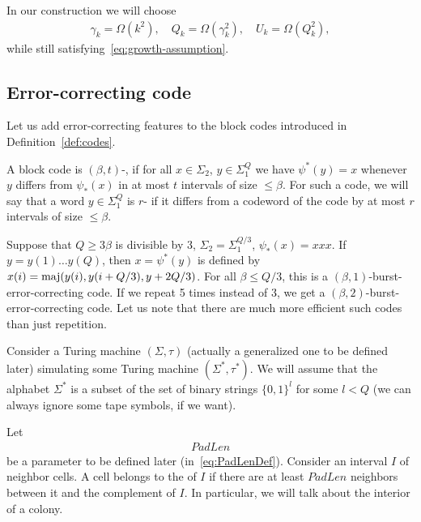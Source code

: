 \documentclass[11pt]{memoir}
\theoremstyle{definition} %
\renewcommand{\le}{\leq}
\renewcommand{\ge}{\geq}
\def\U{U}
\newcommand{\Q}{Q}
\newcommand{\PadLen}{\mathit{PadLen}}
\begin{document}
In our construction we will choose
\begin{align*}
  \gamma_{k}=\Omega(k^{2}),
  \quad \Q_{k} = \Omega(\gamma_{k}^{2}),
  \quad \U_{k} = \Omega(\Q_{k}^{2}),
\end{align*}
while still satisfying~\eqref{eq:growth-assumption}.

\subsection{Error-correcting code}\label{sec:coding}

Let us add error-correcting features to the block codes introduced in
Definition~\ref{def:codes}.

\begin{sloppypar}
\begin{definition}\label{def:err-code}
A block code is \( (\beta,t) \)-,
if for all \( x\in\Sigma_{2} \), \( y\in\Sigma_{1}^{\Q} \) we
have \( \psi^{*}(y)=x \) whenever \( y \) differs from
\( \psi_{*}(x) \) in at most \( t \) intervals of size \( \le\beta \).
For such a code, we will say that a word \( y\in\Sigma_{1}^{\Q} \) is \( r \)-
if it differs from a codeword of the code by at most \( r \) intervals of size \( \le\beta \).
\end{definition}
  \end{sloppypar}

\begin{example}\label{xmp:tripling}
  Suppose that \( \Q\ge 3\beta \) is divisible by 3,
  \( \Sigma_{2}=\Sigma_{1}^{\Q/3} \), \( \psi_{*}(x)=xxx \).
  If \( y=y(1)\dots y(\Q) \), then \( x=\psi^{*}(y) \) is defined by
    \( x(i)=\maj(y(i),y(i+\Q/3),y+2\Q/3) \).
    For all \( \beta\le \Q/3 \), this is a
    \( (\beta,1) \)-burst-error-correcting code.
    If we repeat 5 times instead of 3, we get a \( (\beta,2) \)-burst-error-correcting
    code.
    Let us note that there are much more efficient such codes than just repetition.
 \end{example}

Consider a Turing machine 
\( (\Sigma,\tau) \) (actually a generalized one to be defined later)
simulating some Turing machine \( (\Sigma^{*},\tau^{*}) \).
We will assume that the alphabet \( \Sigma^{*} \) is a subset of the set of  binary strings
\( \{0,1\}^{l} \) for some \( l<\Q \) (we can always ignore some tape
symbols, if we want).

\begin{definition}[Interior]\label{def:interior}
Let 
\begin{align*}
  \PadLen 
\end{align*}
be a parameter to be defined later (in~\eqref{eq:PadLenDef}).
Consider an interval \( I \) of neighbor cells.
A cell belongs to the  of \( I \) if there are at least \( \PadLen \) neighbors between it 
and the complement of \( I \).
In particular, we will talk about the interior of a colony.
\end{definition}
\end{document}
